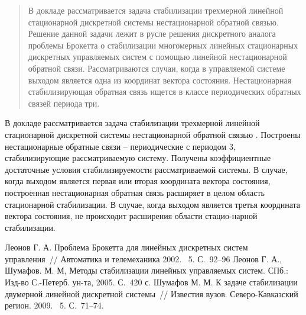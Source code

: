 \maketitle

\begin{abstract}
В докладе рассматривается задача стабилизации трехмерной линейной стационарной дискретной системы нестационарной обратной связью. Решение данной задачи лежит в русле решения дискретного аналога проблемы Брокетта о стабилизации многомерных линейных стационарных дискретных управляемых систем с помощью линейной нестационарной обратной связи. Рассматриваются случаи, когда в управляемой системе выходом является одна из координат вектора состояния. Нестационарная стабилизирующая обратная связь ищется в классе периодических обратных связей периода три.

\end{abstract}


В докладе рассматривается задача стабилизации трехмерной линейной стационарной дискретной системы нестационарной обратной связью \cite{vor1,vor2,vor3}. 
Построены нестационарные обратные связи  -- периодические с периодом 3, стабилизирующие рассматриваемую систему. Получены коэффициентные достаточные условия стабилизируемости рассматриваемой системы. В случае, когда выходом является первая или вторая координата вектора состояния, построенная нестационарная обратная связь расширяет в целом область стационарной стабилизации. В случае, когда выходом является третья координата вектора состояния, не происходит расширения области стацио-нарной стабилизации.


\begin{thebibliography}{99}
Леонов Г. А. Проблема Брокетта для линейных дискретных систем управления~// Автоматика и телемеханика 2002. \textnumero~5. С.~92–96
Леонов Г. А., Шумафов. М. М, Методы стабилизации линейных управляемых систем. СПб.: Изд-во С.-Петерб. ун-та, 2005. С.~420 с.
Шумафов М. М. К задаче стабилизации двумерной линейной дискретной системы~// Известия вузов. Северо-Кавказский регион. 2009.  \textnumero~5. С.~71–74.
\end{thebibliography}






%
